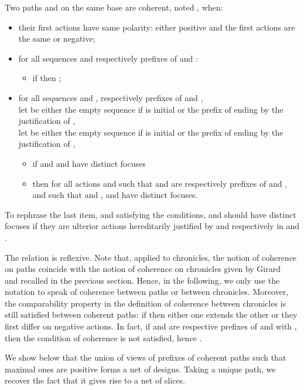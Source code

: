 \documentclass{LMCS}
\begin{document}
\begin{defi}\label{defi:coherence_path}
Two paths  and  on the same base are
coherent, noted , when: 
\begin{itemize}[label=]
\item their first actions have same polarity: either positive and the first actions are the same or negative;
\item for all sequences  and   respectively prefixes of  and  :
\begin{itemize}[label=\quad]
\item if  then ;
\end{itemize}
\item for all sequences  and  , respectively prefixes of  and  , \\
let  be either the empty sequence if  is initial or the prefix of  ending by the justification of , \\
let  be either the empty sequence if  is initial or the prefix of  ending by the justification of ,
\begin{itemize}[label=\quad]
\item if  and  and  have distinct focuses
\item then for all actions  and  such that   and   are respectively prefixes of  and , and such that   and ,  and  have distinct focuses.
\end{itemize}
\end{itemize}
To rephrase the last item,  and  satisfying the conditions,  and  should have distinct focuses if they are ulterior actions hereditarily justified by  and  respectively in  and .

\end{defi}

The relation  is reflexive. 
Note that, applied to chronicles, the notion of coherence on paths coincide with the notion of coherence on chronicles given by Girard~\cite{DBLP:journals/mscs/Girard01} and recalled in the previous section.
Hence, in the following, we only use the notation  to speak of coherence between paths or between chronicles.
Moreover, the comparability property in the definition of coherence between chronicles is still satisfied between coherent paths: if  then either one extends the other or they first differ on negative actions. 
In fact, if  and  are respective prefixes of  and   with , then the condition of coherence is not satisfied, hence .\bigskip


We show below that the union of views of prefixes of coherent paths such that maximal ones are positive forms a net of designs. Taking a unique path, we recover the fact that it gives rise to a net of slices.\bigskip
\end{document}
